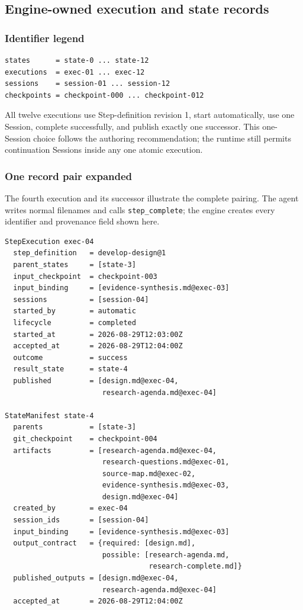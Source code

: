 \documentclass[11pt]{article}
\begin{document}
\subsection{Engine-owned execution and state records}

\subsubsection{Identifier legend}

\begin{lstlisting}[style=playbook]
states      = state-0 ... state-12
executions  = exec-01 ... exec-12
sessions    = session-01 ... session-12
checkpoints = checkpoint-000 ... checkpoint-012
\end{lstlisting}

All twelve executions use Step-definition revision 1, start automatically, use
one Session, complete successfully, and publish exactly one successor. This
one-Session choice follows the authoring recommendation; the runtime still
permits continuation Sessions inside any one atomic execution.

\subsubsection{One record pair expanded}

The fourth execution and its successor illustrate the complete pairing. The
agent writes normal filenames and calls \texttt{step\_complete}; the engine
creates every identifier and provenance field shown here.

\begin{lstlisting}[style=playbook]
StepExecution exec-04
  step_definition   = develop-design@1
  parent_states     = [state-3]
  input_checkpoint  = checkpoint-003
  input_binding     = [evidence-synthesis.md@exec-03]
  sessions          = [session-04]
  started_by        = automatic
  lifecycle         = completed
  started_at        = 2026-08-29T12:03:00Z
  accepted_at       = 2026-08-29T12:04:00Z
  outcome           = success
  result_state      = state-4
  published         = [design.md@exec-04,
                       research-agenda.md@exec-04]

StateManifest state-4
  parents           = [state-3]
  git_checkpoint    = checkpoint-004
  artifacts         = [research-agenda.md@exec-04,
                       research-questions.md@exec-01,
                       source-map.md@exec-02,
                       evidence-synthesis.md@exec-03,
                       design.md@exec-04]
  created_by        = exec-04
  session_ids       = [session-04]
  input_binding     = [evidence-synthesis.md@exec-03]
  output_contract   = {required: [design.md],
                       possible: [research-agenda.md,
                                  research-complete.md]}
  published_outputs = [design.md@exec-04,
                       research-agenda.md@exec-04]
  accepted_at       = 2026-08-29T12:04:00Z
\end{lstlisting}
\end{document}
